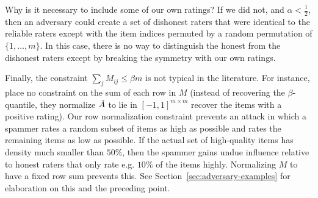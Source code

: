 Why is it necessary to include some of our own ratings? 
If we did not, and $\alpha < \frac{1}{2}$, then an adversary could create a set of 
dishonest raters that were identical to the reliable raters except with the 
item indices permuted by a random permutation of $\{1,\ldots,m\}$. In this case, 
there is no way to distinguish the honest from the dishonest raters except by 
breaking the symmetry with our own ratings.

Finally, the constraint $\sum_j M_{ij} \leq \beta m$ is 
not typical in the literature. For instance, \citep{chen2014improved} 
place no 
constraint on the sum of each row in $M$ (instead of recovering 
the $\beta$-quantile, they normalize $\tilde{A}$ to lie in $[-1,1]^{m \times m}$ recover 
the items with a positive rating).
Our row normalization constraint prevents an attack 
in which a spammer rates a random subset of items as high as possible and 
rates the remaining items as low as possible. If the actual set of 
high-quality items has density much smaller than $50\%$, then the 
spammer gains undue influence relative to honest raters that 
only rate e.g. $10\%$ of the items highly. Normalizing $M$ to 
have a fixed row sum prevents this. See Section~\ref{sec:adversary-examples} 
for elaboration on this and the preceding point.
